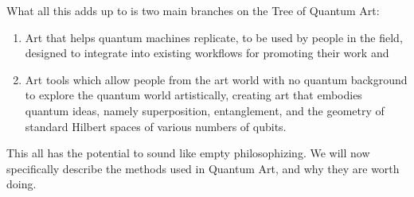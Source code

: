 \documentclass[11pt]{article}
\begin{document}
What all this adds up to is two main branches on the Tree of Quantum Art:

\begin{enumerate}

    \item

        Art that helps quantum machines replicate, to be used by people in the field, designed to integrate into existing workflows for promoting their work and
    
    \item

        Art tools which allow people from the art world with no quantum background to explore the quantum world artistically, creating art that embodies quantum ideas, namely superposition, entanglement, and the geometry of standard Hilbert spaces of various numbers of qubits. 
    
\end{enumerate}



This all has the potential to sound like empty philosophizing.  We will now specifically describe the methods used in Quantum Art, and why they are worth doing.
\end{document}
